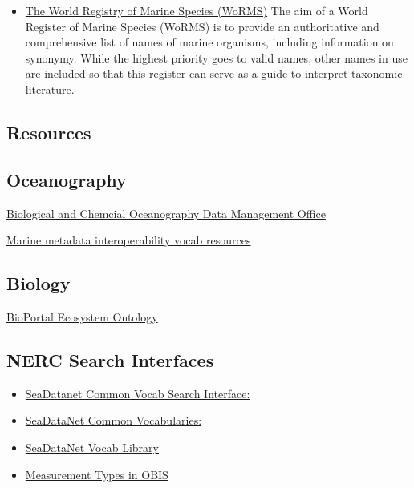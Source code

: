 \documentclass[
]{book}
\providecommand{\tightlist}{%
  \setlength{\itemsep}{0pt}\setlength{\parskip}{0pt}}
\begin{document}
\begin{itemize}
\tightlist
\item
  \href{https://www.marinespecies.org/}{The World Registry of Marine Species (WoRMS)} The aim of a World Register of Marine Species (WoRMS) is to provide an authoritative and comprehensive list of names of marine organisms, including information on synonymy. While the highest priority goes to valid names, other names in use are included so that this register can serve as a guide to interpret taxonomic literature.
\end{itemize}

\hypertarget{resources}{%
\subsection{Resources}\label{resources}}

\hypertarget{oceanography}{%
\subsection{Oceanography}\label{oceanography}}

\href{http://www.bco-dmo.org/}{Biological and Chemcial Oceanography Data Management Office}

\href{https://mmisw.org/ont/\#/}{Marine metadata interoperability vocab resources}

\hypertarget{biology}{%
\subsection{Biology}\label{biology}}

\href{http://bioportal.bioontology.org/ontologies/ECSO}{BioPortal Ecosystem Ontology}

\hypertarget{nerc-search-interfaces}{%
\subsection{NERC Search Interfaces}\label{nerc-search-interfaces}}

\begin{itemize}
\item
  \href{http://seadatanet.maris2.nl/v_bodc_vocab_v2/welcome.asp}{SeaDatanet Common Vocab Search Interface:}
\item
  \href{https://www.seadatanet.org/Standards/Common-Vocabularies/}{SeaDataNet Common Vocabularies:}
\item
  \href{http://seadatanet.maris2.nl/v_bodc_vocab_v2/vocab_relations.asp?lib=P08}{SeaDataNet Vocab Library}
\item
  \href{https://mof.obis.org/}{Measurement Types in OBIS}
\end{itemize}
\end{document}
